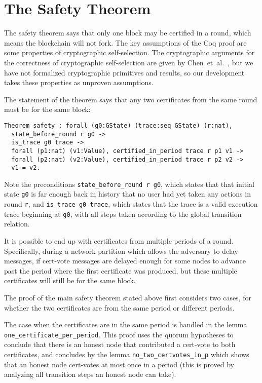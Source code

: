 \section{The Safety Theorem}
\label{sec:safety}

The safety theorem says that only one block may be certified in a round,
which means the blockchain will not fork.
The key assumptions of the Coq proof are some properties of cryptographic self-selection.
The cryptographic arguments for the correctness of cryptographic self-selection
are given by Chen~et~al.~\cite{Chen2019,Chen2018}, but we have not formalized cryptographic
primitives and results, so our development takes these properties as unproven assumptions.

The statement of the theorem says that any two certificates from the same round
must be for the same block:

\begin{lstlisting}[language=Coq]
Theorem safety : forall (g0:GState) (trace:seq GState) (r:nat),
  state_before_round r g0 ->
  is_trace g0 trace ->
  forall (p1:nat) (v1:Value), certified_in_period trace r p1 v1 ->
  forall (p2:nat) (v2:Value), certified_in_period trace r p2 v2 ->
  v1 = v2.
\end{lstlisting}

Note the preconditions \lstinline{state_before_round r g0}, which states that
that initial state \lstinline{g0} is far enough back in history that no user
had yet taken any actions in round \lstinline{r}, and \lstinline[breaklines=true]{is_trace g0 trace},
which states that the trace is a valid execution trace beginning at \lstinline{g0},
with all steps taken according to the global transition relation.

It is possible to end up with certificates from multiple periods of a round.
Specifically, during a network partition which allows the adversary to delay messages,
if cert-vote messages are delayed enough for some nodes to advance past the
period where the first certificate was produced, but these multiple certificates
will still be for the same block.

The proof of the main safety theorem stated above first considers two
cases, for whether the two certificates are from the same period or different
periods.

The case when the certificates are in the same period is handled in the lemma
\lstinline{one_certificate_per_period}.
This proof uses the quorum hypotheses to conclude that there is an honest node
that contributed a cert-vote to both certificates,
and concludes by the lemma \lstinline{no_two_certvotes_in_p} which shows that an
honest node cert-votes at most once in a period (this is proved by analyzing
all transition steps an honest node can take).

